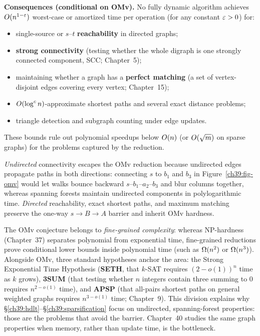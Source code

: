 \begin{formalbox}
\textbf{Consequences (conditional on OMv).} No fully dynamic algorithm achieves
$O(n^{1-\varepsilon})$ worst-case or amortized time per operation (for any constant $\varepsilon>0$)
for:
\begin{itemize}
  \item single-source or $s$--$t$ \textbf{reachability} in directed graphs;
  \item \textbf{strong connectivity} (testing whether the whole digraph is one strongly
        connected component, SCC; Chapter~5);
  \item maintaining whether a graph has a \textbf{perfect matching} (a set of
        vertex-disjoint edges covering every vertex; Chapter~15);
  \item $O(\log^c n)$-approximate shortest paths and several exact distance problems;
  \item triangle detection and subgraph counting under edge updates.
\end{itemize}
These bounds rule out polynomial speedups below $O(n)$ (or $O(\sqrt m)$ on sparse
graphs) for the problems captured by the reduction.
\end{formalbox}

\begin{intuitionbox}
\emph{Undirected} connectivity escapes the OMv reduction because undirected edges
propagate paths in both directions: connecting $s$ to $b_1$ and $b_3$ in
Figure~\ref{ch39:fig-omv} would let walks bounce backward $s$--$b_1$--$a_2$--$b_3$ and
blur columns together, whereas spanning forests maintain undirected components in
polylogarithmic time. \emph{Directed} reachability, exact shortest paths, and maximum
matching preserve the one-way $s \to B \to A$ barrier and inherit OMv hardness.
\end{intuitionbox}

\begin{connectionbox}
The OMv conjecture belongs to \emph{fine-grained complexity}: whereas NP-hardness
(Chapter~37) separates polynomial from exponential time, fine-grained reductions prove
conditional lower bounds inside polynomial time (such as $\Omega(n^2)$ or $\Omega(n^3)$).
Alongside OMv, three standard hypotheses anchor the area: the Strong Exponential Time
Hypothesis (\textbf{SETH}, that $k$-SAT requires $(2-o(1))^n$ time as $k$ grows),
\textbf{3SUM} (that testing whether $n$ integers contain three summing to $0$ requires
$n^{2-o(1)}$ time), and \textbf{APSP} (that all-pairs shortest paths on general weighted
graphs requires $n^{3-o(1)}$ time; Chapter~9). This division explains why
\S\ref{ch39:hdlt}--\S\ref{ch39:sparsification} focus on undirected, spanning-forest
properties: those are the problems that avoid the barrier. Chapter~40 studies the same
graph properties when memory, rather than update time, is the bottleneck.
\end{connectionbox}

